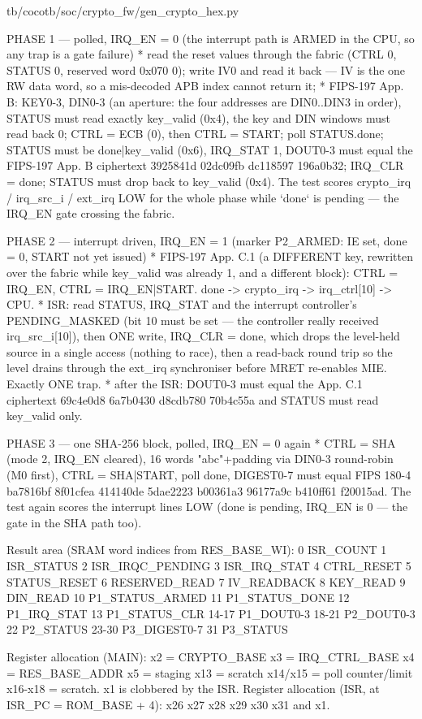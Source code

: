 \begin{relocated}{tb/cocotb/soc/crypto_fw/gen_crypto_hex.py}
\begin{textblock}
PHASE 1 — polled, IRQ_EN = 0 (the interrupt path is ARMED in the CPU, so any trap is a gate failure)
* read the reset values through the fabric (CTRL 0, STATUS 0, reserved word 0x070 0); write IV0
and read it back — IV is the one RW data word, so a mis-decoded APB index cannot return it;
* FIPS-197 App. B: KEY0-3, DIN0-3 (an aperture: the four addresses are DIN0..DIN3 in order),
STATUS must read exactly key_valid (0x4), the key and DIN windows must read back 0;
CTRL = ECB (0), then CTRL = START; poll STATUS.done; STATUS must be done|key_valid (0x6),
IRQ_STAT 1, DOUT0-3 must equal the FIPS-197 App. B ciphertext 3925841d 02dc09fb dc118597
196a0b32; IRQ_CLR = done; STATUS must drop back to key_valid (0x4).
The test scores crypto_irq / irq_src_i / ext_irq LOW for the whole phase while `done` is pending —
the IRQ_EN gate crossing the fabric.

PHASE 2 — interrupt driven, IRQ_EN = 1  (marker P2_ARMED: IE set, done = 0, START not yet issued)
* FIPS-197 App. C.1 (a DIFFERENT key, rewritten over the fabric while key_valid was already 1,
and a different block): CTRL = IRQ_EN, CTRL = IRQ_EN|START.
done -> crypto_irq -> irq_ctrl[10] -> CPU.
* ISR: read STATUS, IRQ_STAT and the interrupt controller's PENDING_MASKED (bit 10 must be set —
the controller really received irq_src_i[10]), then ONE write, IRQ_CLR = done, which drops the
level-held source in a single access (nothing to race), then a read-back round trip so the level
drains through the ext_irq synchroniser before MRET re-enables MIE. Exactly ONE trap.
* after the ISR: DOUT0-3 must equal the App. C.1 ciphertext 69c4e0d8 6a7b0430 d8cdb780 70b4c55a
and STATUS must read key_valid only.

PHASE 3 — one SHA-256 block, polled, IRQ_EN = 0 again
* CTRL = SHA (mode 2, IRQ_EN cleared), 16 words "abc"+padding via DIN0-3 round-robin (M0 first),
CTRL = SHA|START, poll done, DIGEST0-7 must equal FIPS 180-4 ba7816bf 8f01cfea 414140de 5dae2223
b00361a3 96177a9c b410ff61 f20015ad. The test again scores the interrupt lines LOW (done is
pending, IRQ_EN is 0 — the gate in the SHA path too).

Result area (SRAM word indices from RES_BASE_WI):
0 ISR_COUNT  1 ISR_STATUS  2 ISR_IRQC_PENDING  3 ISR_IRQ_STAT  4 CTRL_RESET  5 STATUS_RESET
6 RESERVED_READ  7 IV_READBACK  8 KEY_READ  9 DIN_READ  10 P1_STATUS_ARMED  11 P1_STATUS_DONE
12 P1_IRQ_STAT  13 P1_STATUS_CLR  14-17 P1_DOUT0-3  18-21 P2_DOUT0-3  22 P2_STATUS
23-30 P3_DIGEST0-7  31 P3_STATUS

Register allocation (MAIN): x2 = CRYPTO_BASE  x3 = IRQ_CTRL_BASE  x4 = RES_BASE_ADDR  x5 = staging
x13 = scratch  x14/x15 = poll counter/limit  x16-x18 = scratch.  x1 is clobbered by the ISR.
Register allocation (ISR, at ISR_PC = ROM_BASE + 4): x26 x27 x28 x29 x30 x31 and x1.
\end{textblock}

\end{relocated}


